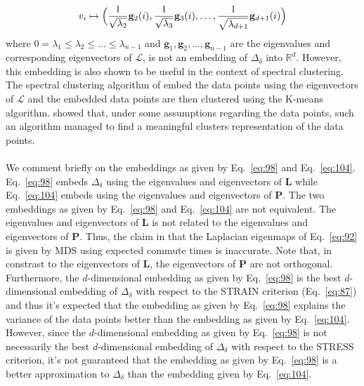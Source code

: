\begin{equation}
  \label{eq:102}
  v_i \mapsto \Bigl( \frac{1}{\sqrt{\lambda_2}} \mathbf{g}_2(i),
  \frac{1}{\sqrt{\lambda_3}}\mathbf{g}_3(i), \dots, \frac{1}{\sqrt{
      \lambda_{d+1}}} \mathbf{g}_{d+1}(i) \Bigr)
\end{equation}
where $0 = \lambda_1 \leq \lambda_2 \leq \dots \leq \lambda_{n-1}$ and
$\bm{g}_1, \bm{g}_2, \dots, \bm{g}_{n-1}$ are the eigenvalues and
corresponding eigenvectors of $\bm{\mathcal{L}}$, is not an embedding
of $\Delta_{\delta}$ into $\mathbb{R}^{d}$. However, this embedding is
also shown to be useful in the context of spectral clustering. The
spectral clustering algorithm of \citet{ng02} embed the data points
using the eigenvectors of $\bm{\mathcal{L}}$ and the embedded data
points are then clustered using the K-means algorithm. \citet{ng02}
showed that, under some assumptions regarding the data points, such an
algorithm managed to find a meaningful clusters representation of the
data points.
\\ \\
%
%
\noindent
We comment briefly on the embeddings as given by Eq.~\eqref{eq:98} and
Eq.~\eqref{eq:104}. Eq.~\eqref{eq:98} embeds $\Delta_{\delta}$ using
the eigenvalues and eigenvectors of $\mathbf{L}$ while
Eq.~\eqref{eq:104} embeds using the eigenvalues and eigenvectors of
$\mathbf{P}$. The two embeddings as given by Eq.~\eqref{eq:98} and
Eq.~\eqref{eq:104} are not equivalent. The eigenvalues and
eigenvectors of $\mathbf{L}$ is not related to the eigenvalues and
eigenvectors of $\mathbf{P}$. Thus, the claim in \citet{saul06:_semis}
that the Laplacian eigenmaps of Eq.~\eqref{eq:92} is given by MDS
using expected commute times is inaccurate. Note that, in constrast to
the eigenvectors of $\mathbf{L}$, the eigenvectors of $\mathbf{P}$ are
not orthogonal. Furthermore, the $d$-dimensional embedding as given by
Eq.~\eqref{eq:98} is the best $d$-dimensional embedding of
$\Delta_{\delta}$ with respect to the STRAIN criterion
(Eq.~\eqref{eq:87}) and thus it's expected that the embedding as given
by Eq.~\eqref{eq:98} explains the variance of the data points better
than the embedding as given by Eq.~\eqref{eq:104}. However, since the
$d$-dimensional embedding as given by Eq.~\eqref{eq:98} is not
necessarily the best $d$-dimensional embedding of $\Delta_{\delta}$
with respect to the STRESS criterion, it's not guaranteed that the
embedding as given by Eq.~\eqref{eq:98} is a better approximation to
$\Delta_\delta$ than the embedding given by Eq.~\eqref{eq:104}.

